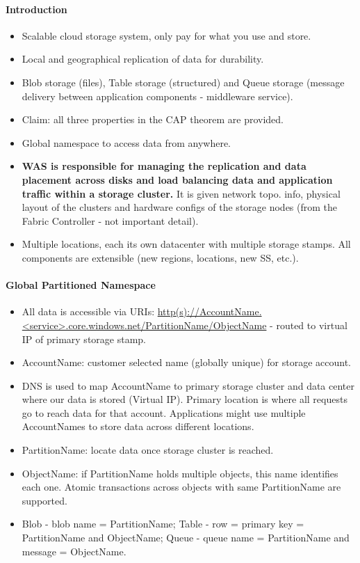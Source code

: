 \paragraph{Introduction}
\begin{itemize}
    \item Scalable cloud storage system, only pay for what you use and store.
    \item Local and geographical replication of data for durability.
    \item Blob storage (files), Table storage (structured) and Queue storage (message delivery between application components - middleware service).
    \item Claim: all three properties in the CAP theorem are provided.
    \item Global namespace to access data from anywhere.
    \item \textbf{WAS is responsible for managing the replication and data placement across disks and load balancing data and application traffic within a storage cluster.} It is given network topo. info, physical layout of the clusters and hardware configs of the storage nodes (from the Fabric Controller - not important detail).
    \item Multiple locations, each its own datacenter with multiple storage stamps. All components are extensible (new regions, locations, new SS, etc.).
\end{itemize}

\paragraph{Global Partitioned Namespace}
\begin{itemize}
    \item All data is accessible via URIs: \url{http(s)://AccountName.<service>.core.windows.net/PartitionName/ObjectName} - routed to virtual IP of primary storage stamp.
    \item AccountName: customer selected name (globally unique) for storage account.
    \item DNS is used to map AccountName to primary storage cluster and data center where our data is stored (Virtual IP). Primary location is where all requests go to reach data for that account. Applications might use multiple AccountNames to store data across different locations.
    \item PartitionName: locate data once storage cluster is reached.
    \item ObjectName: if PartitionName holds multiple objects, this name identifies each one. Atomic transactions across objects with same PartitionName are supported.
    \item Blob - blob name = PartitionName; Table - row = primary key = PartitionName and ObjectName; Queue - queue name = PartitionName and message = ObjectName.
\end{itemize}

